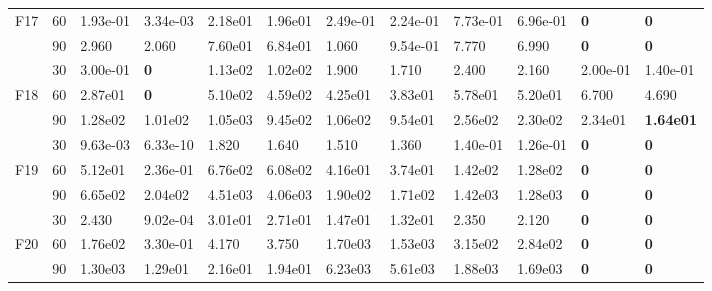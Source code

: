 \begin{table}
\begin{center}
\begin{tabular}{p{0.3in} | p{0.4in} | p{0.6in} |  p{0.6in} |  p{0.6in}|  p{0.6in} |  p{0.6in} | p{0.6in} |  p{0.6in} | p{0.6in} |  p{0.6in} |  p{0.6in}}
F17    &    60    &    1.93e-01    &{    3.34e-03    }&    2.18e01    &    1.96e01    &    2.49e-01    &    2.24e-01    &    7.73e-01    &    6.96e-01    &    \textbf{    0    }&    \textbf{    0    }\\
    &    90    &    2.960    &    2.060    &    7.60e01    &    6.84e01    &    1.060    &{    9.54e-01    }&    7.770    &    6.990    &    \textbf{    0    }&    \textbf{    0    }\\
\hline                                                                                                            
    &    30    &    3.00e-01    &\textbf{    0    }&    1.13e02    &    1.02e02    &    1.900    &    1.710    &    2.400    &    2.160    &    {    2.00e-01    }&    {    1.40e-01    }\\
F18    &    60    &    2.87e01    &\textbf{    0    }&    5.10e02    &    4.59e02    &    4.25e01    &    3.83e01    &    5.78e01    &    5.20e01    &    {    6.700    }&    {    4.690    }\\
    &    90    &    1.28e02    &    1.01e02    &    1.05e03    &    9.45e02    &    1.06e02    &    9.54e01    &    2.56e02    &    2.30e02    &    {    2.34e01    }&    \textbf{    1.64e01    }\\
\hline                                                                                                            
    &    30    &    9.63e-03    &{    6.33e-10    }&    1.820    &    1.640    &    1.510    &    1.360    &    1.40e-01    &    1.26e-01    &    \textbf{    0    }&    \textbf{    0    }\\
F19    &    60    &    5.12e01    &{    2.36e-01    }&    6.76e02    &    6.08e02    &    4.16e01    &    3.74e01    &    1.42e02    &    1.28e02    &    \textbf{    0    }&    \textbf{    0    }\\
    &    90    &    6.65e02    &    2.04e02    &    4.51e03    &    4.06e03    &    1.90e02    &    1.71e02    &    1.42e03    &    1.28e03    &    \textbf{    0    }&    \textbf{    0    }\\                                                                        
    \hline
    &    30    &    2.430    &{    9.02e-04    }&    3.01e01    &    2.71e01    &    1.47e01    &    1.32e01    &    2.350    &    2.120    &    \textbf{    0    }&    \textbf{    0    }\\
F20    &    60    &    1.76e02    &{    3.30e-01    }&    4.170    &    3.750    &    1.70e03    &    1.53e03    &    3.15e02    &    2.84e02    &    \textbf{    0    }&    \textbf{    0    }\\
    &    90    &    1.30e03    &{    1.29e01    }&    2.16e01    &    1.94e01    &    6.23e03    &    5.61e03    &    1.88e03    &    1.69e03    &    \textbf{    0    }&    \textbf{    0    }\\
\hline

\end{tabular}
\end{center}
\label{tab:mean2}
\end{table}



